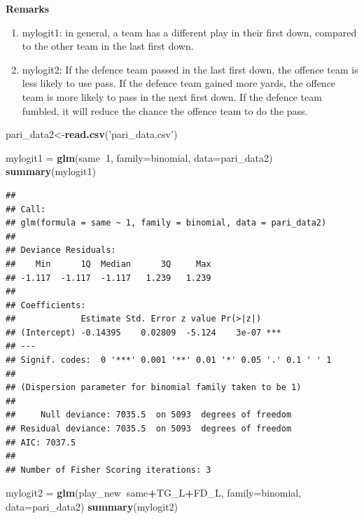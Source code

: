 \documentclass[]{book}
\newenvironment{Shaded}{\begin{snugshade}}{\end{snugshade}}
\newcommand{\DataTypeTok}[1]{\textcolor[rgb]{0.13,0.29,0.53}{#1}}
\newcommand{\DecValTok}[1]{\textcolor[rgb]{0.00,0.00,0.81}{#1}}
\newcommand{\KeywordTok}[1]{\textcolor[rgb]{0.13,0.29,0.53}{\textbf{#1}}}
\newcommand{\NormalTok}[1]{#1}
\newcommand{\OperatorTok}[1]{\textcolor[rgb]{0.81,0.36,0.00}{\textbf{#1}}}
\newcommand{\StringTok}[1]{\textcolor[rgb]{0.31,0.60,0.02}{#1}}
\begin{document}
\textbf{Remarks}

\begin{enumerate}
\def\labelenumi{\arabic{enumi}.}
\item
  mylogit1: in general, a team has a different play in their first down, compared to the other team in the last first down.
\item
  mylogit2: If the defence team passed in the last first down, the offence team is less likely to use pass. If the defence team gained more yards, the offence team is more likely to pass in the next first down. If the defence team fumbled, it will reduce the chance the offence team to do the pass.
\end{enumerate}

\begin{Shaded}
\begin{Highlighting}[]
\NormalTok{pari_data2<-}\KeywordTok{read.csv}\NormalTok{(}\StringTok{'pari_data.csv'}\NormalTok{)}

\NormalTok{mylogit1 =}\StringTok{ }\KeywordTok{glm}\NormalTok{(same}\OperatorTok{~}\DecValTok{1}\NormalTok{, }\DataTypeTok{family=}\NormalTok{binomial, }\DataTypeTok{data=}\NormalTok{pari_data2)}
\KeywordTok{summary}\NormalTok{(mylogit1)}
\end{Highlighting}
\end{Shaded}

\begin{verbatim}
## 
## Call:
## glm(formula = same ~ 1, family = binomial, data = pari_data2)
## 
## Deviance Residuals: 
##    Min      1Q  Median      3Q     Max  
## -1.117  -1.117  -1.117   1.239   1.239  
## 
## Coefficients:
##             Estimate Std. Error z value Pr(>|z|)    
## (Intercept) -0.14395    0.02809  -5.124    3e-07 ***
## ---
## Signif. codes:  0 '***' 0.001 '**' 0.01 '*' 0.05 '.' 0.1 ' ' 1
## 
## (Dispersion parameter for binomial family taken to be 1)
## 
##     Null deviance: 7035.5  on 5093  degrees of freedom
## Residual deviance: 7035.5  on 5093  degrees of freedom
## AIC: 7037.5
## 
## Number of Fisher Scoring iterations: 3
\end{verbatim}

\begin{Shaded}
\begin{Highlighting}[]
\NormalTok{mylogit2 =}\StringTok{ }\KeywordTok{glm}\NormalTok{(play_new}\OperatorTok{~}\NormalTok{same}\OperatorTok{+}\NormalTok{TG_L}\OperatorTok{+}\NormalTok{FD_L, }\DataTypeTok{family=}\NormalTok{binomial, }\DataTypeTok{data=}\NormalTok{pari_data2)}
\KeywordTok{summary}\NormalTok{(mylogit2)}
\end{Highlighting}
\end{Shaded}
\end{document}
